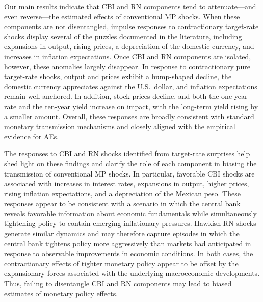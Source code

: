 \documentclass[\latexroot/\projectname]{subfiles}
\begin{document}
Our main results indicate that CBI and RN components tend to attenuate—and even reverse—the estimated effects of conventional MP shocks. When these components are not disentangled, impulse responses to contractionary target-rate shocks display several of the puzzles documented in the literature, including expansions in output, rising prices, a depreciation of the domestic currency, and increases in inflation expectations. Once CBI and RN components are isolated, however, these anomalies largely disappear. In response to contractionary pure target-rate shocks, output and prices exhibit a hump-shaped decline, the domestic currency appreciates against the U.S.\ dollar, and inflation expectations remain well anchored. In addition, stock prices decline, and both the
one-year rate and the ten-year yield increase on impact, with the long-term yield rising by
a smaller amount. Overall, these responses are broadly consistent with standard monetary
transmission mechanisms and closely aligned with the empirical evidence for AEs.

The responses to CBI and RN shocks identified from target-rate surprises help shed light on these findings and clarify the role of each component in biasing the transmission of conventional MP shocks. In particular, favorable CBI shocks are associated with increases in interest rates, expansions in output, higher prices, rising inflation expectations, and a depreciation of the Mexican peso. These responses appear to be consistent with a scenario in which the central bank reveals favorable information about economic fundamentals while simultaneously tightening policy to contain emerging inflationary pressures. Hawkish RN shocks generate similar dynamics and may therefore capture episodes in which the central bank tightens policy more aggressively than markets had anticipated in response to observable improvements in economic conditions. In both cases, the contractionary effects of tighter monetary policy appear to be offset by the expansionary forces associated with the underlying macroeconomic developments. Thus, failing to disentangle CBI and RN components may lead to biased estimates of monetary policy effects.
\end{document}
